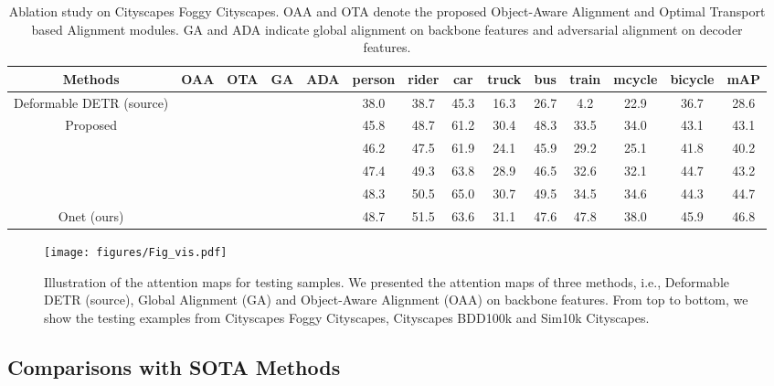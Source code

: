 \documentclass[sigconf]{acmart}
\begin{document}
\begin{table*}[t]
    \centering
    \small
    \caption{Ablation study on Cityscapes  Foggy Cityscapes. OAA and OTA denote the proposed Object-Aware Alignment and Optimal Transport based Alignment modules. GA and ADA indicate global alignment on backbone features and adversarial alignment on decoder features.} \label{tab:ablation}
    \setlength{\tabcolsep}{2mm}
    \begin{tabular}{c|cccc|cccccccc|c}
        \toprule[1.0pt]
        Methods & OAA & OTA & GA & ADA  & person & rider & car & truck & bus & train & mcycle & bicycle & mAP \\
        \hline
        Deformable DETR (source) &  &  &  &  & 38.0 & 38.7 & 45.3 & 16.3 & 26.7 & 4.2 & 22.9 & 36.7  & 28.6 \\
        \hline
\multirow{4}{*}{Proposed} &  &  &  &  & 45.8 & 48.7 & 61.2 & 30.4 & 48.3 & 33.5 & 34.0 & 43.1 & 43.1 \\
&  &  &  &  & 46.2 & 47.5 & 61.9 & 24.1 & 45.9 & 29.2 & 25.1 & 41.8 & 40.2 \\
         &  &  &  &  & 47.4 & 49.3 & 63.8 & 28.9 & 46.5 & 32.6 & 32.1 & 44.7 & 43.2 \\
         &  &  &  &  & 48.3 & 50.5 & 65.0 & 30.7 & 49.5 & 34.5 & 34.6 & 44.3 & 44.7 \\
        \hline
        
        Onet (ours) &  &  &  &  & 48.7 & 51.5 & 63.6 & 31.1 & 47.6 & 47.8 & 38.0 & 45.9 & 46.8 \\
        \bottomrule[1.0pt]
    \end{tabular}
\vspace{-4mm}
\end{table*}

\begin{figure*}[t]
    \centerline{\texttt{[image: figures/Fig\_vis.pdf]}} \vspace{-4mm}
    \caption{Illustration of the attention maps for testing samples. We presented the attention maps of three methods, i.e., Deformable DETR (source), Global Alignment (GA) and Object-Aware Alignment (OAA) on backbone features. From top to bottom, we show the testing examples from Cityscapes  Foggy Cityscapes, Cityscapes BDD100k and Sim10k  Cityscapes.}
    \label{fig:fig_heatmap}
    \vspace{-4mm}
\end{figure*}



\subsection{Comparisons with SOTA Methods}
\end{document}
